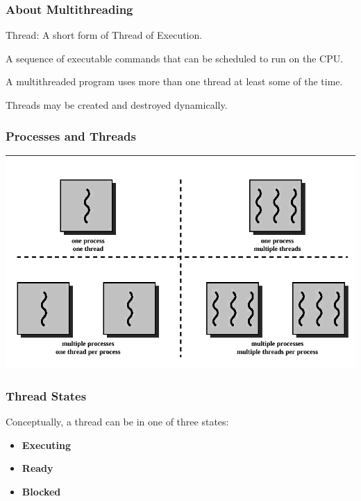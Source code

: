 \begin{frame}
\frametitle{About Multithreading}
\begin{changemargin}{1cm}
Thread: A short form of \alert{Thread of Execution}.

A sequence of executable commands that can be scheduled to run on the CPU. 

A multithreaded program uses more than one thread at least some of the time. 

Threads may be created and destroyed dynamically.

\end{changemargin}
\end{frame}

\begin{frame}
\frametitle{Processes and Threads}
\begin{center}
	\includegraphics[width=\textwidth]{images/mthread.png}
\end{center}
\end{frame}

\begin{frame}
\frametitle{Thread States}
\begin{changemargin}{1cm}
Conceptually, a thread can be in one of three states:
\begin{itemize}
	\item \textbf{Executing}
	\item \textbf{Ready}
	\item \textbf{Blocked}
\end{itemize}
\end{changemargin}
\end{frame}

